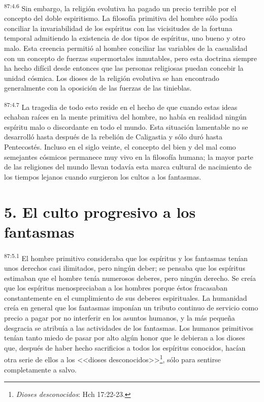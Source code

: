 \documentclass[twoside, 11pt]{book}
\begin{document}
\par
\textsuperscript{87:4.6} Sin embargo, la religión evolutiva ha pagado un precio terrible por el concepto del doble espiritismo. La filosofía primitiva del hombre sólo podía conciliar la invariabilidad de los espíritus con las vicisitudes de la fortuna temporal admitiendo la existencia de dos tipos de espíritus, uno bueno y otro malo. Esta creencia permitió al hombre conciliar las variables de la casualidad con un concepto de fuerzas supermortales inmutables, pero esta doctrina siempre ha hecho difícil desde entonces que las personas religiosas puedan concebir la unidad cósmica. Los dioses de la religión evolutiva se han encontrado generalmente con la oposición de las fuerzas de las tinieblas.

\par
\textsuperscript{87:4.7} La tragedia de todo esto reside en el hecho de que cuando estas ideas echaban raíces en la mente primitiva del hombre, no había en realidad ningún espíritu malo o discordante en todo el mundo. Esta situación lamentable no se desarrolló hasta después de la rebelión de Caligastia y sólo duró hasta Pentecostés. Incluso en el siglo veinte, el concepto del bien y del mal como semejantes cósmicos permanece muy vivo en la filosofía humana; la mayor parte de las religiones del mundo llevan todavía esta marca cultural de nacimiento de los tiempos lejanos cuando surgieron los cultos a los fantasmas.

\section*{5. El culto progresivo a los fantasmas}
\par
\textsuperscript{87:5.1} El hombre primitivo consideraba que los espíritus y los fantasmas tenían unos derechos casi ilimitados, pero ningún deber; se pensaba que los espíritus estimaban que el hombre tenía numerosos deberes, pero ningún derecho. Se creía que los espíritus menospreciaban a los hombres porque éstos fracasaban constantemente en el cumplimiento de sus deberes espirituales. La humanidad creía en general que los fantasmas imponían un tributo continuo de servicio como precio a pagar por no interferir en los asuntos humanos, y la más pequeña desgracia se atribuía a las actividades de los fantasmas. Los humanos primitivos tenían tanto miedo de pasar por alto algún honor que le debieran a los dioses que, después de haber hecho sacrificios a todos los espíritus conocidos, hacían otra serie de ellos a los <<dioses desconocidos>>\footnote{\textit{Dioses desconocidos}: Hch 17:22-23.}, sólo para sentirse completamente a salvo.
\end{document}

